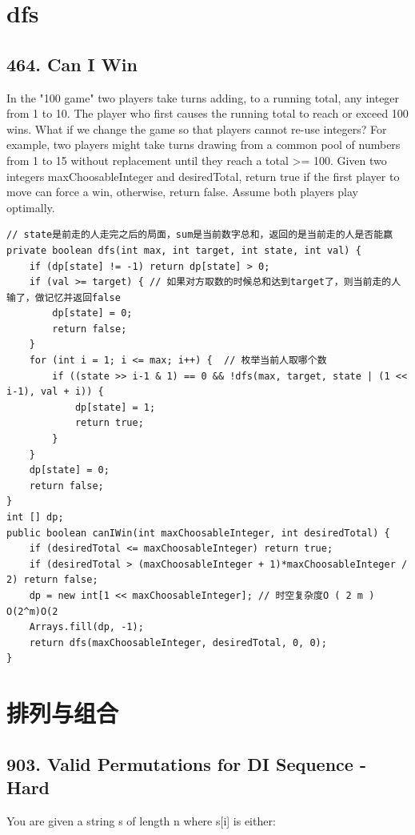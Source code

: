 \documentclass[9pt, b5paaper]{book}
\begin{document}
\chapter{dfs}
\label{sec-15}
\section{464. Can I Win}
\label{sec-15-1}
In the "100 game" two players take turns adding, to a running total, any integer from 1 to 10. The player who first causes the running total to reach or exceed 100 wins.
What if we change the game so that players cannot re-use integers?
For example, two players might take turns drawing from a common pool of numbers from 1 to 15 without replacement until they reach a total >= 100.
Given two integers maxChoosableInteger and desiredTotal, return true if the first player to move can force a win, otherwise, return false. Assume both players play optimally.
\begin{verbatim}
// state是前走的人走完之后的局面，sum是当前数字总和，返回的是当前走的人是否能赢
private boolean dfs(int max, int target, int state, int val) {
    if (dp[state] != -1) return dp[state] > 0;
    if (val >= target) { // 如果对方取数的时候总和达到target了，则当前走的人输了，做记忆并返回false
        dp[state] = 0;
        return false;
    }
    for (int i = 1; i <= max; i++) {  // 枚举当前人取哪个数
        if ((state >> i-1 & 1) == 0 && !dfs(max, target, state | (1 << i-1), val + i)) {
            dp[state] = 1;
            return true;
        }
    }
    dp[state] = 0;
    return false;
}
int [] dp;
public boolean canIWin(int maxChoosableInteger, int desiredTotal) {
    if (desiredTotal <= maxChoosableInteger) return true;
    if (desiredTotal > (maxChoosableInteger + 1)*maxChoosableInteger / 2) return false;
    dp = new int[1 << maxChoosableInteger]; // 时空复杂度O ( 2 m ) O(2^m)O(2 
    Arrays.fill(dp, -1);
    return dfs(maxChoosableInteger, desiredTotal, 0, 0);
}
\end{verbatim}


\chapter{排列与组合}
\label{sec-16}
\section{903. Valid Permutations for DI Sequence - Hard}
\label{sec-16-1}
You are given a string s of length n where s[i] is either:
\end{document}

